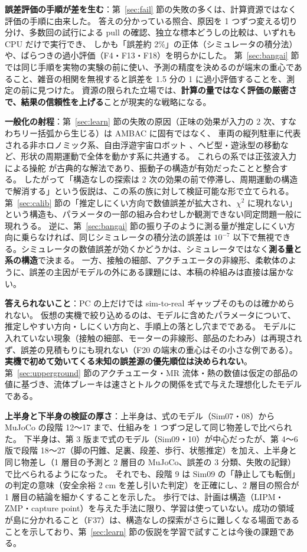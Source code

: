 \documentclass[paper=a4paper,fontsize=10pt,twocolumn,column_gap=2zw,line_length=24zw,number_of_lines=46,head_space=20mm]{jlreq}
\begin{document}
\textbf{誤差評価の手順が差を生む}：第~\ref{sec:fail} 節の失敗の多くは、計算資源ではなく評価の手順に由来した。
答えの分かっている照合、原因を 1 つずつ変える切り分け、多数回の試行による pull の確認、独立な標本どうしの比較は、いずれも CPU だけで実行でき、
しかも「誤差約 2\%」の正体（シミュレータの積分法）や、ばらつきの過小評価（F4・F13・F18）を明らかにした。
第~\ref{sec:bangai} 節では同じ手順を実物の実験の前に使い、予測の精度を決めるのが端末の重心であること、雑音の相関を無視すると誤差を 1.5 分の 1 に過小評価することを、測定の前に見つけた。
資源の限られた立場では、\textbf{計算の量ではなく評価の厳密さで、結果の信頼性を上げる}ことが現実的な戦略になる。

\textbf{一般化の射程}：第~\ref{sec:learn} 節の失敗の原因（正味の効果が入力の 2 次、すなわちリー括弧から生じる）は AMBAC に固有ではなく、
車両の縦列駐車に代表される非ホロノミック系、自由浮遊宇宙ロボット \cite{nakamura1991}、ヘビ型・遊泳型の移動など、形状の周期運動で全体を動かす系に共通する。
これらの系では正弦波入力による操舵 \cite{murray1993} が古典的な解法であり、振動子の構造が有効だったことと整合する。
したがって「構造なしの探索は 2 次の効果の前で停滞し、周期運動の構造で解消する」という仮説は、この系の族に対して検証可能な形で立てられる。
第~\ref{sec:calib} 節の「推定しにくい方向で数値誤差が拡大され、$\chi^2$ に現れない」という構造も、パラメータの一部の組み合わせしか観測できない同定問題一般に現れうる。
逆に、第~\ref{sec:bangai} 節の振り子のように測る量が推定しにくい方向に乗らなければ、同じシミュレータの積分法の誤差は $10^{-7}$ 以下で無視できる。シミュレータの数値誤差が効くかどうかは、シミュレータではなく\textbf{測る量と系の構造}で決まる。
一方、接触の細部、アクチュエータの非線形、柔軟体のように、誤差の主因がモデルの外にある課題には、本稿の枠組みは直接は届かない。

\textbf{答えられないこと}：PC の上だけでは sim-to-real ギャップそのものは確かめられない。
仮想の実機で絞り込めるのは、モデルに含めたパラメータについて、推定しやすい方向・しにくい方向と、手順上の落とし穴までである。
モデルに入れていない現象（接触の細部、モーターの非線形、部品のたわみ）は再現されず、誤差の見積もりにも現れない（F20 の端末の重心はその小さな例である）。\textbf{実機で初めて効いてくる未知の誤差源の優先順位は決められない}。
第~\ref{sec:upperground} 節のアクチュエータ・MR 流体・熱の数値は仮定の部品の値に基づき、流体ブレーキは速さとトルクの関係を式で与えた理想化したモデルである。

\textbf{上半身と下半身の検証の厚さ}：上半身は、式のモデル（Sim07・08）から MuJoCo の段階 12〜17 まで、仕組みを 1 つずつ足して同じ物差しで比べられた。
下半身は、第 3 版まで式のモデル（Sim09・10）が中心だったが、第 4〜6 版で段階 18〜27（脚の円錐、足裏、段差、歩行、状態推定）を加え、上半身と同じ物差し（1 層目の予測と 2 層目の MuJoCo、誤差の 3 分類、失敗の記録）で比べられるようになった。
それでも、段階 9 は Sim09 の「静止しても転倒」の判定の意味（安全余裕 2 cm を差し引いた判定）を正確にし、2 層目の照合が 1 層目の結論を細かくすることを示した。
歩行では、計画は構造（LIPM・ZMP・capture point）を与えた手法に限り、学習は使っていない。成功の領域が島に分かれること（F37）は、構造なしの探索がさらに難しくなる場面であることを示しており、第~\ref{sec:learn} 節の仮説を学習で試すことは今後の課題である。
\end{document}
